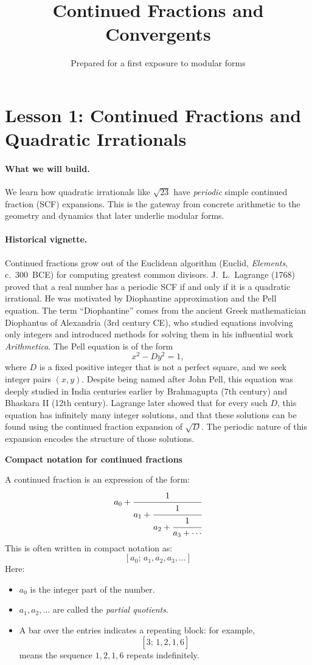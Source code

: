 \documentclass[11pt]{article}
\title{Continued Fractions and Convergents}
\author{Prepared for a first exposure to modular forms}
\date{}
\begin{document}
\maketitle

\section*{Lesson 1: Continued Fractions and Quadratic Irrationals}

\paragraph{What we will build.}
We learn how quadratic irrationals like $\sqrt{23}$ have \emph{periodic} simple continued fraction (SCF) expansions. This is the gateway from concrete arithmetic to the geometry and dynamics that later underlie modular forms.

\paragraph{Historical vignette.}
Continued fractions grow out of the Euclidean algorithm (Euclid, \emph{Elements}, c.\ 300~BCE) for computing greatest common divisors. J.\ L.\ Lagrange (1768) proved that a real number has a periodic SCF if and only if it is a quadratic irrational. He was motivated by Diophantine approximation and the Pell equation. The term “Diophantine” comes from the ancient Greek mathematician Diophantus of Alexandria (3rd century CE), who studied equations involving only integers and introduced methods for solving them in his influential work \emph{Arithmetica}.
\smallskip
\noindent
The Pell equation is of the form
\[
x^2 - D y^2 = 1,
\]
where \( D \) is a fixed positive integer that is not a perfect square, and we seek integer pairs \( (x, y) \). Despite being named after John Pell, this equation was deeply studied in India centuries earlier by Brahmagupta (7th century) and Bhaskara II (12th century). Lagrange later showed that for every such \( D \), this equation has infinitely many integer solutions, and that these solutions can be found using the continued fraction expansion of \( \sqrt{D} \). The periodic nature of this expansion encodes the structure of those solutions.

\smallskip
\noindent
\textbf{Compact notation for continued fractions}

A continued fraction is an expression of the form:
\[
a_0 + \cfrac{1}{a_1 + \cfrac{1}{a_2 + \cfrac{1}{a_3 + \cdots}}}
\]
This is often written in compact notation as:
\[
[a_0;\, a_1, a_2, a_3, \dots]
\]
Here:
\begin{itemize}
  \item \( a_0 \) is the integer part of the number.
  \item \( a_1, a_2, \dots \) are called the \emph{partial quotients}.
  \item A bar over the entries indicates a repeating block: for example,
  \[
  [3;\, \overline{1,2,1,6}]
  \]
  means the sequence \( 1,2,1,6 \) repeats indefinitely.
\end{itemize}
\end{document}
